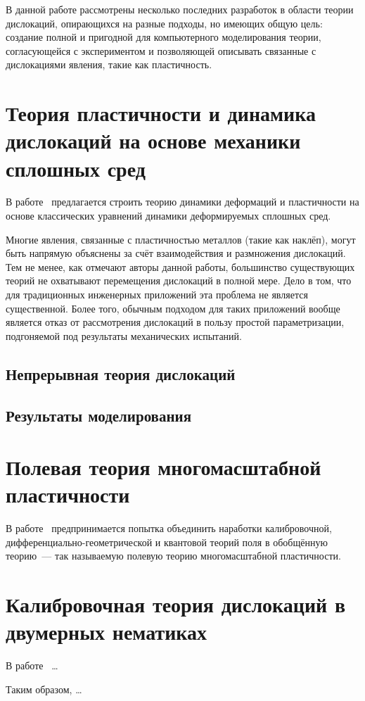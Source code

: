 \documentclass[a4paper, 14pt, titlepage]{extarticle}
\begin{document}
  В данной работе рассмотрены несколько последних разработок в области теории дислокаций,
  опирающихся на разные подходы, но имеющих общую цель: создание полной и пригодной для
  компьютерного моделирования теории, согласующейся с экспериментом и позволяющей описывать
  связанные с дислокациями явления, такие как пластичность.

  \section{Теория пластичности и динамика дислокаций на основе механики сплошных сред}

  В работе~\cite{hochrainer-cdd} предлагается строить теорию динамики деформаций и пластичности на
  основе классических уравнений динамики деформируемых сплошных сред.

  Многие явления, связанные с пластичностью металлов (такие как наклёп), могут быть напрямую
  объяснены за счёт взаимодействия и размножения дислокаций. Тем не менее, как отмечают авторы
  данной работы, большинство существующих теорий не охватывают перемещения дислокаций в полной мере.
  Дело в том, что для традиционных инженерных приложений эта проблема не является существенной.
  Более того, обычным подходом для таких приложений вообще является отказ от рассмотрения дислокаций
  в пользу простой параметризации, подгоняемой под результаты механических испытаний.



  \subsection{Непрерывная теория дислокаций} %
  \subsection{Результаты моделирования}

  \section{Полевая теория многомасштабной пластичности}

  В работе~\cite{hasebe-ftmp} предпринимается попытка объединить наработки калибровочной,
  дифференциально-геометрической и квантовой теорий поля в обобщённую теорию~--- так называемую
  полевую теорию многомасштабной пластичности.

  \section{Калибровочная теория дислокаций в двумерных нематиках}

  В работе~\cite{liu-nematic} \dots


  Таким образом, \dots

  \PrintBibliography
\end{document}
